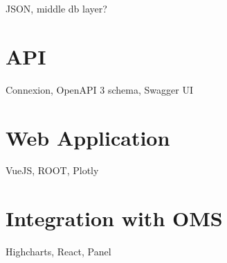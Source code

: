 JSON, middle db layer?

\section{API}

Connexion, OpenAPI 3 schema, Swagger UI

\section{Web Application}

VueJS, ROOT, Plotly

\section{Integration with OMS}

Highcharts, React, Panel


